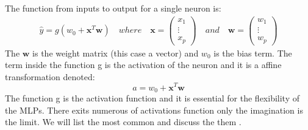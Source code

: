 The function from inputs to output for a single neuron is:
\begin{align}   
\hat{y}=g(w_0 + \bm{x}^T \bm{w}) \quad where \quad \bm{x}=\begin{pmatrix}
x_1 \\
\vdots\\
x_p
\end{pmatrix} \quad and \quad \bm{w}=\begin{pmatrix}
w_1 \\
\vdots \\
w_p
\end{pmatrix}
\end{align}
The $\bm{w}$ is the weight matrix (this case a vector) and $w_0$ is the bias term. The term inside the function g is the activation of the neuron and it is a affine transformation denoted:
$$a= w_0 + \bm{x}^T \bm{w}$$
The function g is the activation function and it is essential for the flexibility of the MLPs. There exits numerous of activations function only the imagination is the limit. We will list the most common and discuss the them \parencite{Mackay18}.


